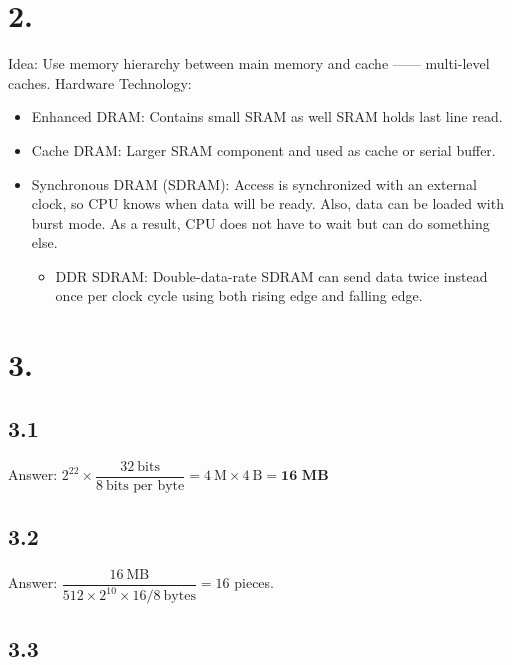 \documentclass[11pt]{article}  %
\begin{document}
\section*{2. }
Idea: Use memory hierarchy between main memory and cache —— multi-level caches.
Hardware Technology: 
\begin{itemize}
    \item Enhanced DRAM: Contains small SRAM as well SRAM holds last line read.
    \item Cache DRAM: Larger SRAM component and used as cache or serial buffer.
    \item Synchronous DRAM (SDRAM): 
    Access is synchronized with an external clock, so CPU knows when data will be ready.
    Also, data can be loaded with burst mode.
    As a result, CPU does not have to wait but can do something else.
    \begin{itemize}
        \item DDR SDRAM: Double-data-rate SDRAM can send data twice instead once per clock cycle using both rising edge and falling edge.
    \end{itemize}
\end{itemize}

\section*{3. }

\subsection*{3.1}

Answer:  $2^{22}\times \dfrac{32~\text{bits}}{8~\text{bits per byte}} = 4~\text{M} \times 4~\text{B} = \textbf{16 MB}$

\subsection*{3.2}

Answer: $\dfrac{16~\text{MB}}{512\times 2^{10} \times  16 / 8~\text{bytes}} = 16$ pieces.

\subsection*{3.3}
\end{document}

